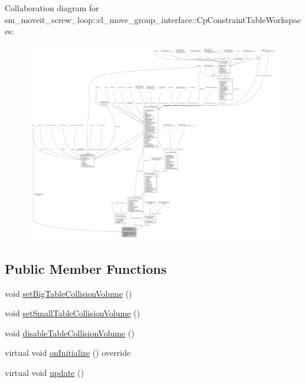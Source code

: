 Collaboration diagram for sm\+\_\+moveit\+\_\+screw\+\_\+loop\+:\+:cl\+\_\+move\+\_\+group\+\_\+interface\+:\+:Cp\+Constraint\+Table\+Workspaces\+:
\nopagebreak
\begin{figure}[H]
\begin{center}
\leavevmode
\includegraphics[width=350pt]{classsm__moveit__screw__loop_1_1cl__move__group__interface_1_1CpConstraintTableWorkspaces__coll__graph}
\end{center}
\end{figure}
\subsection*{Public Member Functions}
\begin{DoxyCompactItemize}
\item 
void \hyperlink{classsm__moveit__screw__loop_1_1cl__move__group__interface_1_1CpConstraintTableWorkspaces_af5dbacf9dce9270788273a44ad4cbea4}{set\+Big\+Table\+Collision\+Volume} ()
\item 
void \hyperlink{classsm__moveit__screw__loop_1_1cl__move__group__interface_1_1CpConstraintTableWorkspaces_a602bb7b5acc3f249b59516ce071fd8ea}{set\+Small\+Table\+Collision\+Volume} ()
\item 
void \hyperlink{classsm__moveit__screw__loop_1_1cl__move__group__interface_1_1CpConstraintTableWorkspaces_a4c60d31f82a7f62afbb4540b0825c724}{disable\+Table\+Collision\+Volume} ()
\item 
virtual void \hyperlink{classsm__moveit__screw__loop_1_1cl__move__group__interface_1_1CpConstraintTableWorkspaces_aaf31156acbb0c4acb0626807b92d8e3e}{on\+Initialize} () override
\item 
virtual void \hyperlink{classsm__moveit__screw__loop_1_1cl__move__group__interface_1_1CpConstraintTableWorkspaces_a873050debbad5977c78beb93a0b6ce77}{update} ()
\end{DoxyCompactItemize}
